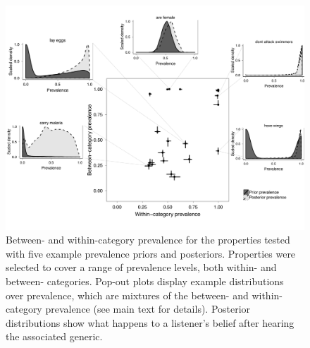 \documentclass[10pt,letterpaper]{article}
\begin{document}

\begin{figure}
\centering
    \includegraphics[width=\columnwidth]{prevalence-scatter-wDists-black.pdf}
    \caption{Between- and within-category prevalence for the properties tested with five example prevalence priors and posteriors.
    Properties were selected to cover a range of prevalence levels, both within- and between- categories.
    Pop-out plots display example distributions over prevalence, which are mixtures of the between- and within- category prevalence (see main text for details). 
    Posterior distributions show what happens to a listener's belief after hearing the associated generic. }
  \label{fig:priors1a}
\end{figure}
\end{document}
